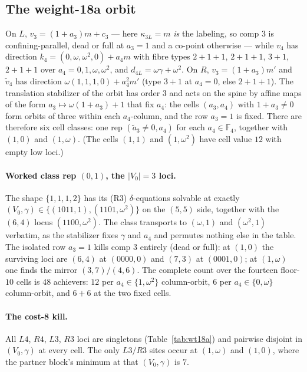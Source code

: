\documentclass[11pt]{article}
\newcommand{\F}[1]{\mathbb{F}_{#1}}
\theoremstyle{plain}
\theoremstyle{definition}
\theoremstyle{remark}
\begin{document}
\subsection{The weight-18a orbit}\label{ssec:wt18a}

On $L$, $v_3=(1+a_3)m+c_3$ --- here $\kappa_{3L}=m$ \emph{is} the labeling, so comp $3$ is
confining-parallel, dead or full at $a_3=1$ and a co-point otherwise --- while $v_4$ has
direction $k_4=(0,\omega,\omega^2,0)+a_4 m$ with fibre types $2{+}1{+}1$, $2{+}1{+}1$,
$3{+}1$, $2{+}1{+}1$ over $a_4=0,1,\omega,\omega^2$, and $d_{4L}=\omega\gamma+\omega^2$. On
$R$, $v_3=(1+a_3)m'$ and $\tilde v_4$ has direction $\omega(1,1,1,0)+a_4^2 m'$ (type $3{+}1$
at $a_4=0$, else $2{+}1{+}1$). The translation stabilizer of the orbit has order $3$ and acts
on the spine by affine maps of the form $a_3\mapsto\omega(1+a_3)+1$ that fix $a_4$: the cells
$(a_3,a_4)$ with $1+a_3\ne 0$ form orbits of three within each $a_4$-column, and the row
$a_3=1$ is fixed. There are therefore six cell classes: one rep $(\tilde a_3\ne 0,a_4)$ for
each $a_4\in\F4$, together with $(1,0)$ and $(1,\omega)$. (The cells $(1,1)$ and
$(1,\omega^2)$ have cell value $12$ with empty low loci.)

\paragraph{Worked class rep $(0,1)$, the $|V_0|=3$ loci.}
The shape $\{1,1,1,2\}$ has its (R3) $\delta$-equations solvable at exactly
$(V_0,\gamma)\in\{(1011,1),(1101,\omega^2)\}$ on the $(5,5)$ side, together with the $(6,4)$
locus $(1100,\omega^2)$. The class transports to $(\omega,1)$ and $(\omega^2,1)$ verbatim, as
the stabilizer fixes $\gamma$ and $a_4$ and permutes nothing else in the table. The isolated
row $a_3=1$ kills comp $3$ entirely (dead or full): at $(1,0)$ the surviving loci are $(6,4)$
at $(0000,0)$ and $(7,3)$ at $(0001,0)$; at $(1,\omega)$ one finds the mirror $(3,7)/(4,6)$.
The complete count over the fourteen floor-$10$ cells is $48$ achievers: $12$ per $a_4\in
\{1,\omega^2\}$ column-orbit, $6$ per $a_4\in\{0,\omega\}$ column-orbit, and $6+6$ at the two
fixed cells.

\paragraph{The cost-8 kill.}
All $L4$, $R4$, $L3$, $R3$ loci are singletons (Table~\ref{tab:wt18a}) and pairwise disjoint
in $(V_0,\gamma)$ at every cell. The only $L3/R3$ sites occur at $(1,\omega)$ and $(1,0)$,
where the partner block's minimum at that $(V_0,\gamma)$ is $7$.
\end{document}
